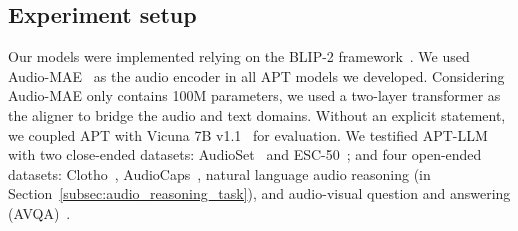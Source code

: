 \documentclass{article} %
\begin{document}
\begin{table}[t]
\centering
\caption{Zero-shot performance comparison with audio language models. We group the methods in terms of their training strategy. ``\#Params.'' denotes the number of trainable parameters and ``\#Pairs'' represents the number of audio-text pairs. $\uparrow$ indicates the higher number, the better performance.}
\vspace{1em}
\label{tab.:existing_tasks}
\end{table}

\subsection{Experiment setup} \label{subsec:experiment_setup}
Our models were implemented relying on the BLIP-2 framework~\citep{li_blip-2_2023}. We used Audio-MAE~\citep{huang_masked_2022} as the audio encoder in all APT models we developed. Considering Audio-MAE only contains 100M parameters, we used a two-layer transformer as the aligner to bridge the audio and text domains. Without an explicit statement, we coupled APT with Vicuna 7B v1.1~\citep{chiang_vicuna_2023} for evaluation. We testified APT-LLM with two close-ended datasets: AudioSet~\citep{gemmeke_audio_2017} and ESC-50~\citep{piczak_esc_2015}; and four open-ended datasets: Clotho~\citep{drossos_clotho_2020}, AudioCaps~\citep{kim_audiocaps_2019}, natural language audio reasoning (in Section~\ref{subsec:audio_reasoning_task}), and audio-visual question and answering (AVQA)~\citep{yang_avqa_2022}.
\end{document}
